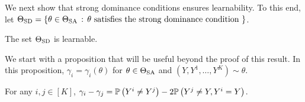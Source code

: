 We next show that strong dominance conditions ensures learnability. To this end,
let $\Theta_{\mathrm{SD}} = \{ \theta\in \Theta_{\mathrm{SA}}\,:\, \theta \text{ satisfies the strong dominance condition } \}$.

\begin{thm}
\label{thm:tsdlearnable}
The set $\Theta_{\mathrm{SD}}$ is learnable.
\end{thm}
We start with a proposition that will be useful beyond the proof of this result.
In this proposition, $\gamma_i = \gamma_i(\theta)$ for $\theta \in \Theta_{\mathrm{SA}}$ and $(Y,Y^1,\dots,Y^K) \sim \theta$.
\begin{prop}\label{prop:gammadiff}
For any $i,j\in [K]$, $\gamma_i - \gamma_j = \mathbb{P}\left(Y^i\ne Y^j\right) - 2\mathbb{P}\left( Y^j \ne Y, Y^i=Y\right)$.
\end{prop}


